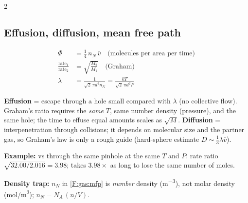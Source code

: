 \begin{multicols}{2}
\subsection{Effusion, diffusion, mean free path}\label{sec:effusion}
\begin{formulabox}
\vspace{-6pt}
\begin{align}
\Phi &= \tfrac14\,n_N\,\bar v\quad\text{(molecules per area per time)} \label{F:gas:effusion}\\
\frac{\text{rate}_1}{\text{rate}_2} &= \sqrt{\frac{M_2}{M_1}}\quad\text{(Graham)} \label{F:gas:graham}\\
\lambda &= \frac{1}{\sqrt2\,\pi d^2 n_N}=\frac{kT}{\sqrt2\,\pi d^2P} \label{F:gas:mfp}
\end{align}
\end{formulabox}
\textbf{Effusion} = escape through a hole small compared with $\lambda$ (no collective flow). Graham's ratio requires the \emph{same} $T$, same number density (pressure), and the same hole; the time to effuse equal amounts scales as $\sqrt M$. \textbf{Diffusion} = interpenetration through collisions; it depends on molecular size and the partner gas, so Graham's law is only a rough guide (hard-sphere estimate $D\sim\tfrac13\lambda\bar v$).

\textbf{Example:}  vs  through the same pinhole at the same $T$ and $P$: rate ratio $\sqrt{32.00/2.016}=3.98$;  takes $3.98\times$ as long to lose the same number of moles.

\textbf{Density trap:} $n_N$ in \eqref{F:gas:mfp} is \emph{number} density (\si{m^{-3}}), not molar density (\si{mol/m^3}); $n_N=N_A\,(n/V)$.


\end{multicols}

